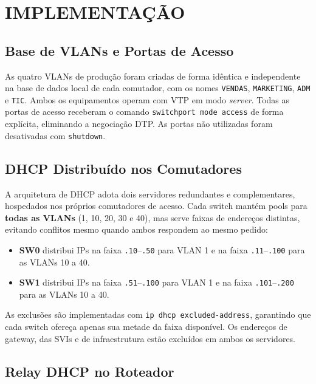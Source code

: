 \section{IMPLEMENTAÇÃO}

\subsection{Base de VLANs e Portas de Acesso}

As quatro VLANs de produção foram criadas de forma idêntica e independente na base de
dados local de cada comutador, com os nomes \texttt{VENDAS}, \texttt{MARKETING},
\texttt{ADM} e \texttt{TIC}. Ambos os equipamentos operam com VTP em modo
\textit{server}. Todas as portas de acesso receberam o comando
\texttt{switchport mode access} de forma explícita, eliminando a negociação DTP.
As portas não utilizadas foram desativadas com \texttt{shutdown}.

\subsection{DHCP Distribuído nos Comutadores}

A arquitetura de DHCP adota dois servidores redundantes e complementares, hospedados
nos próprios comutadores de acesso. Cada switch mantém pools para \textbf{todas as
VLANs} (1, 10, 20, 30 e 40), mas serve faixas de endereços distintas, evitando
conflitos mesmo quando ambos respondem ao mesmo pedido:

\begin{itemize}[leftmargin=2em]
  \item \textbf{SW0} distribui IPs na faixa \texttt{.10}--\texttt{.50} para VLAN 1
        e na faixa \texttt{.11}--\texttt{.100} para as VLANs 10 a 40.
  \item \textbf{SW1} distribui IPs na faixa \texttt{.51}--\texttt{.100} para VLAN 1
        e na faixa \texttt{.101}--\texttt{.200} para as VLANs 10 a 40.
\end{itemize}

As exclusões são implementadas com \texttt{ip dhcp excluded-address}, garantindo que
cada switch ofereça apenas sua metade da faixa disponível. Os endereços de gateway,
das SVIs e de infraestrutura estão excluídos em ambos os servidores.

\subsection{Relay DHCP no Roteador}

